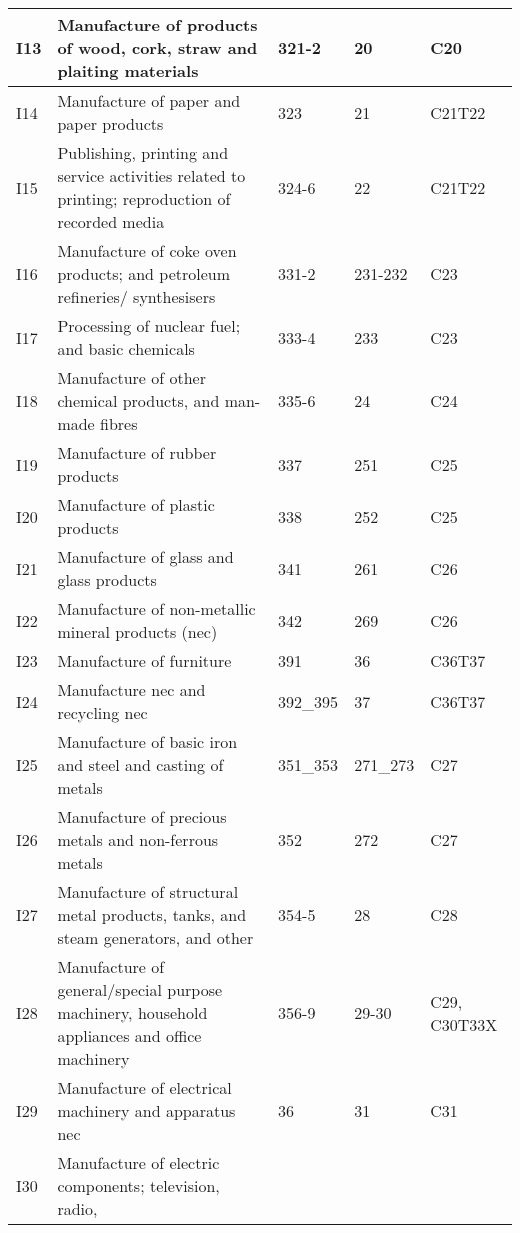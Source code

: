 \documentclass[12pt,english]{article}
\begin{document}
\begin{table}[ht]
\begin{adjustbox}{width=\textwidth}
\begin{tabular}{lp{500pt}lll}
		I13 & Manufacture of products of wood, cork, straw and plaiting materials%
		& 321-2 & 20 & C20 \\ \midrule
		I14 & Manufacture of paper and paper products & 323 & 21 & C21T22 \\ \midrule
		I15 & Publishing, printing and service activities related to printing; reproduction of recorded media & 324-6 & 22 & C21T22 \\ \midrule
		I16 & Manufacture of coke oven products; and petroleum refineries/ synthesisers & 331-2 & 231-232 & C23 \\ \midrule
		I17 & Processing of nuclear fuel; and basic chemicals & 333-4 & 233 & C23 \\ \midrule
		I18 & Manufacture of other chemical products, and man-made fibres & 335-6 & 24 & C24 \\ \midrule
		I19 & Manufacture of rubber products & 337 & 251 & C25 \\ \midrule
		I20 & Manufacture of plastic products & 338 & 252 & C25 \\ \midrule
		I21 & Manufacture of glass and glass products & 341 & 261 & C26 \\ \midrule
		I22 & Manufacture of non-metallic mineral products (nec) & 342 & 269 & C26 \\ \midrule
		I23 & Manufacture of furniture & 391 & 36 & C36T37 \\ \midrule
		I24 & Manufacture nec and recycling nec & 392\_395 & 37 & C36T37 \\ \midrule
		I25 & Manufacture of basic iron and steel and casting of metals & 351\_353 & 271\_273 & C27 \\ \midrule
		I26 & Manufacture of precious metals and non-ferrous metals & 352 & 272 & C27 \\ \midrule
		I27 & Manufacture of structural metal products, tanks, %
		and steam generators, and other %
		& 354-5 & 28 & C28 \\ \midrule
		I28 & Manufacture of general/special purpose machinery, %
		household appliances and office %
		machinery & 356-9 & 29-30 & C29, C30T33X \\ \midrule
		I29 & Manufacture of electrical machinery and apparatus nec & 36 & 31 & C31 \\ \midrule
		I30 & Manufacture of %
		electric components; television, %
		radio, %

\end{tabular}
\end{adjustbox}
\end{table}
\end{document}
